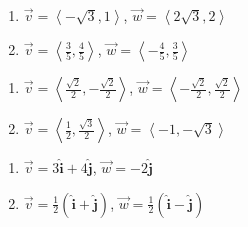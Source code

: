 \begin{multicols}{2}

\begin{enumerate}

\setcounter{enumi}{\value{HW}}

\item $\vec{v} = \left<-\sqrt{3}, 1\right>$, $\vec{w} = \left<2\sqrt{3}, 2\right>$
\item  $\vec{v} = \left<\frac{3}{5}, \frac{4}{5}\right>$, $\vec{w} = \left<-\frac{4}{5}, \frac{3}{5}\right>$

\setcounter{HW}{\value{enumi}}

\end{enumerate}

\end{multicols}

\begin{multicols}{2}

\begin{enumerate}

\setcounter{enumi}{\value{HW}}

\item $\vec{v} = \left<\frac{\sqrt{2}}{2}, -\frac{\sqrt{2}}{2}\right>$, $\vec{w} = \left<-\frac{\sqrt{2}}{2}, \frac{\sqrt{2}}{2} \right>$
\item $\vec{v} = \left<\frac{1}{2}, \frac{\sqrt{3}}{2}  \right>$, $\vec{w} =  \left< -1, -\sqrt{3} \right>$

\setcounter{HW}{\value{enumi}}

\end{enumerate}

\end{multicols}

\begin{multicols}{2}

\begin{enumerate}

\setcounter{enumi}{\value{HW}}

\item $\vec{v} = 3\bm\hat{\text{i}} + 4\bm\hat{\text{j}}$, $\vec{w} = -2\bm\hat{\text{j}}$
\item $\vec{v} =\frac{1}{2} \left(\bm\hat{\text{i}} + \bm\hat{\text{j}}\right)$, $\vec{w} = \frac{1}{2} \left(\bm\hat{\text{i}} - \bm\hat{\text{j}}\right)$ \label{vectorbasiclast}

\setcounter{HW}{\value{enumi}}

\end{enumerate}

\end{multicols}

